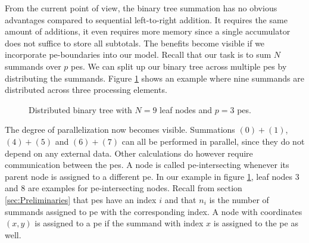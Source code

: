 From the current point of view, the binary tree summation has no obvious advantages compared to sequential left-to-right addition.
It requires the same amount of
additions, it even requires more memory since a single accumulator does not suffice to store all subtotals. The benefits become visible if we
incorporate \gls{pe}-boundaries into our model. Recall that our task is to sum $N$ summands over $p$ \glspl{pe}. We can split up our binary tree across
multiple \glspl{pe} by distributing the summands. Figure \ref{fig:distributed_binary_tree} shows an example where nine summands are distributed
across three processing elements.
\begin{figure}[H]
\centering
{}
\caption{Distributed binary tree with $N=9$ leaf nodes and $p=3$ \glspl{pe}.}
\label{fig:distributed_binary_tree}
\end{figure}
The degree of parallelization now becomes visible. Summations $(0) + (1)$, $(4) + (5)$ and $(6) + (7)$ can all be performed in parallel, since
they do not depend on any external data. Other calculations do however require communication between the \acrshort{pe}s. A node is called \acrshort{pe}-intersecting
whenever its parent node is assigned to a different \gls{pe}. In our example in figure \ref{fig:distributed_binary_tree}, leaf nodes $3$ and $8$ are examples
for \gls{pe}-intersecting nodes.
Recall from section \ref{sec:Preliminaries} that \gls{pe}s have an index $i$ and that $n_i$ is the number of summands assigned to \gls{pe} with the corresponding
index. A node with coordinates $(x, y)$ is assigned to a \gls{pe} if the summand with index $x$ is assigned to the \gls{pe} as well.

